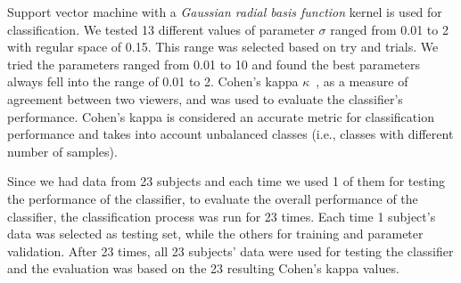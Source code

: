 Support vector machine with a \emph{Gaussian radial basis function} kernel is used for classification. We tested 13 different values of parameter $\sigma$ ranged from 0.01 to 2 with regular space of 0.15. This range was selected based on try and trials. We tried the parameters ranged from 0.01 to 10 and found the best parameters always fell into the range of 0.01 to 2. Cohen's kappa $\kappa$~\cite{uebersax1987diversity}, as a measure of agreement between two viewers, and was used to evaluate the classifier's performance. Cohen's kappa is considered an accurate metric for classification performance and takes into account unbalanced classes (i.e., classes with different number of samples). 

Since we had data from 23 subjects and each time we used 1 of them for testing the performance of the classifier, to evaluate the overall performance of the classifier, the classification process was run for 23 times. Each time 1 subject's data was selected as testing set, while the others for training and parameter validation. After 23 times, all 23 subjects' data were used for testing the classifier and the evaluation was based on the 23 resulting Cohen's kappa values. 
